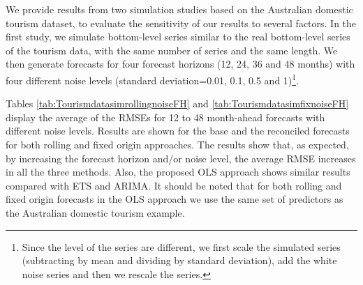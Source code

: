 \documentclass[11pt,a4paper,]{article}
\begin{document}
We provide results from two simulation studies based on the Australian domestic tourism dataset, to evaluate the sensitivity of our results to several factors. In the first study, we simulate bottom-level series similar to the real bottom-level series of the tourism data, with the same number of series and the same length. We then generate forecasts for four forecast horizons (12, 24, 36 and 48 months) with four different noise levels (standard deviation=0.01, 0.1, 0.5 and 1)\footnote{Since the level of the series are different, we first scale the simulated series (subtracting by mean and dividing by standard deviation), add the white noise series and then we rescale the series.}.

Tables \ref{tab:TourismdatasimrollingnoiseFH} and \ref{tab:TourismdatasimfixnoiseFH} display the average of the RMSEs for 12 to 48 month-ahead forecasts with different noise levels. Results are shown for the base and the reconciled forecasts for both rolling and fixed origin approaches. The results show that, as expected, by increasing the forecast horizon and/or noise level, the average RMSE increases in all the three methods. Also, the proposed OLS approach shows similar results compared with ETS and ARIMA. It should be noted that for both rolling and fixed origin forecasts in the OLS approach we use the same set of predictors as the Australian domestic tourism example.
\end{document}
